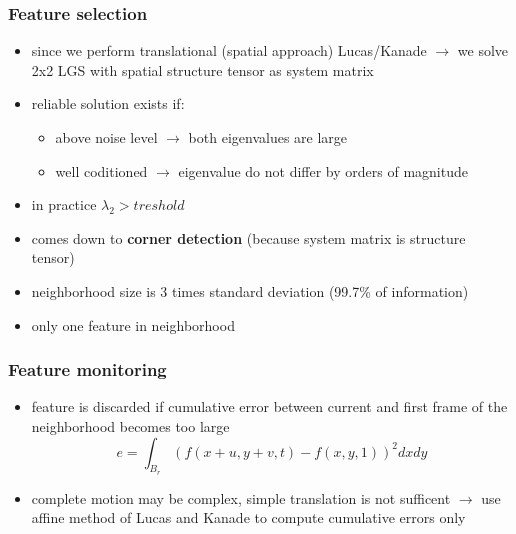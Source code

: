 \documentclass[11pt]{article}
\begin{document}
\subsubsection{Feature selection}
\label{sec-4-2-2}
\begin{itemize}
\item since we perform translational (spatial approach) Lucas/Kanade $\rightarrow$
we solve 2x2 LGS with spatial structure tensor as system matrix
\item reliable solution exists if:
\begin{itemize}
\item above noise level $\rightarrow$ both eigenvalues are large
\item well coditioned $\rightarrow$ eigenvalue do not differ by orders of magnitude
\end{itemize}
\item in practice $\lambda_2 > treshold$
\item comes down to \textbf{corner detection} (because system matrix is structure tensor)
\item neighborhood size is 3 times standard deviation (99.7\% of information)
\item only one feature in neighborhood
\end{itemize}
\subsubsection{Feature monitoring}
\label{sec-4-2-3}
\begin{itemize}
\item feature is discarded if cumulative error between current and first frame of the
neighborhood becomes too large
\[ e = \int_{B_r} (f(x+u,y+v,t)-f(x,y,1))^2 dx dy \]
\item complete motion may be complex, simple translation is not sufficent
      $\rightarrow$ use affine method of Lucas and Kanade to compute cumulative errors only
\end{itemize}
\end{document}
